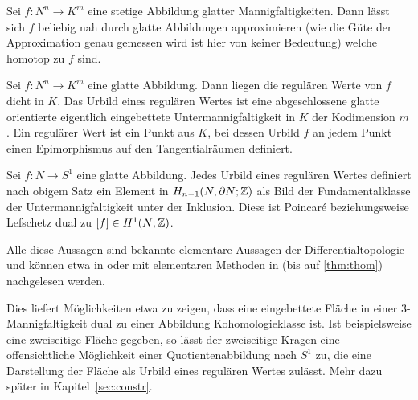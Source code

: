 	\begin{thm}
		Sei $f:N^n\to K^m$ eine stetige Abbildung glatter Mannigfaltigkeiten. Dann lässt sich $f$ beliebig nah durch glatte Abbildungen approximieren (wie die Güte der Approximation genau gemessen wird ist hier von keiner Bedeutung) welche homotop zu $f$ sind.
	\end{thm}
	\begin{thm}
		Sei $f:N^n \to K^m$ eine glatte Abbildung. Dann liegen die regulären Werte von $f$ dicht in $K$. Das Urbild eines regulären Wertes ist eine abgeschlossene glatte orientierte eigentlich eingebettete Untermannigfaltigkeit in $K$ der Kodimension $m$. Ein regulärer Wert ist ein Punkt aus $K$, bei dessen Urbild $f$ an jedem Punkt einen Epimorphismus auf den Tangentialräumen definiert. 
	\end{thm}
	\begin{thm}[Thom]
	\label{thm:thom}
		Sei $f:N \to S^1$ eine glatte Abbildung. Jedes Urbild eines regulären Wertes definiert nach obigem Satz ein Element in $H_{n-1}(N,\partial N;\mathbb{Z})$ als Bild der Fundamentalklasse der Untermannigfaltigkeit unter der Inklusion. Diese ist Poincaré beziehungsweise Lefschetz dual zu $[f]\in H^1(N;\mathbb{Z})$.
	\end{thm}
	Alle diese Aussagen sind bekannte elementare Aussagen der Differentialtopologie und können etwa in \cite{Kreck.2010} oder mit elementaren Methoden in \cite{Hirsch.1991} (bis auf \ref{thm:thom}) nachgelesen werden. 

	Dies liefert Möglichkeiten etwa zu zeigen, dass eine eingebettete Fläche in einer 3-Mannigfaltigkeit dual zu einer Abbildung Kohomologieklasse ist. Ist beispielsweise eine zweiseitige Fläche gegeben, so lässt der zweiseitige Kragen eine offensichtliche Möglichkeit einer Quotientenabbildung nach $S^1$ zu, die eine Darstellung der Fläche als Urbild eines regulären Wertes zulässt. Mehr dazu später in Kapitel~\ref{sec:constr}.
	